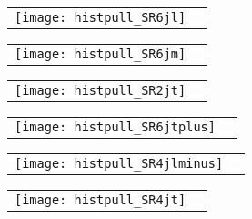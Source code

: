 \documentclass[landscape,12pt,a4paper]{article}
\begin{document}
\clearpage













\clearpage













\clearpage
\begin{figure}[H]\begin{center}\begin{tabular}{cc}\texttt{[image: histpull\_SR6jl]}\end{tabular}\end{center}\end{figure}
\begin{figure}[H]\begin{center}\begin{tabular}{cc}\texttt{[image: histpull\_SR6jm]}\end{tabular}\end{center}\end{figure}
\begin{figure}[H]\begin{center}\begin{tabular}{cc}\texttt{[image: histpull\_SR2jt]}\end{tabular}\end{center}\end{figure}
\begin{figure}[H]\begin{center}\begin{tabular}{cc}\texttt{[image: histpull\_SR6jtplus]}\end{tabular}\end{center}\end{figure}
\begin{figure}[H]\begin{center}\begin{tabular}{cc}\texttt{[image: histpull\_SR4jlminus]}\end{tabular}\end{center}\end{figure}
\begin{figure}[H]\begin{center}\begin{tabular}{cc}\texttt{[image: histpull\_SR4jt]}\end{tabular}\end{center}\end{figure}
\end{document}
